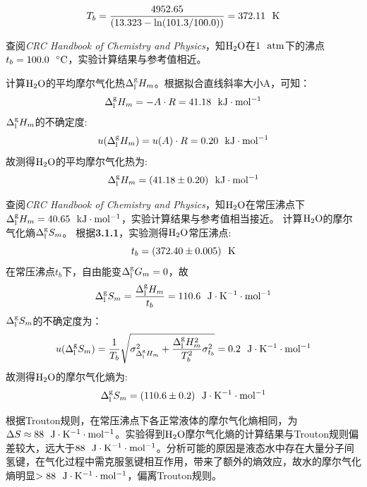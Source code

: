 \documentclass[12pt]{article}
\begin{document}
		$$
			T_{b}=\frac{4952.65}{(13.323-{\rm ln}(101.3/100.0))}=372.11\ \ {\rm K}
		$$
		\par
		查阅\textit{CRC Handbook of Chemistry and Physics}\citealp{crc}，知$\rm H_{2}O$在$\rm 1\ \ atm$下的沸点$t_{b}=100.0\ \ {\rm ^{\circ}C}$，实验计算结果与参考值相近。\par 
		计算$\rm H_{2}O$的平均摩尔气化热$\Delta^{\rm g}_{\rm l}H_{m}$。根据拟合直线斜率大小A，可知：
		$$
			\Delta^{\rm g}_{\rm l}H_{m}=-A\cdot R=41.18\ \ {\rm kJ\cdot mol^{-1}}
		$$
		$\Delta^{\rm g}_{\rm l}H_{m}$的不确定度:
		$$
			u(\Delta^{\rm g}_{\rm l}H_{m})=u(A)\cdot R=0.20\ \ {\rm kJ\cdot mol^{-1}}
		$$
		故测得$\rm H_{2}O$的平均摩尔气化热为:
		$$
			\Delta^{\rm g}_{\rm l}H_{m}=(41.18\pm 0.20)\ \ {\rm kJ\cdot mol^{-1}}
		$$
		\par
		查阅\textit{CRC Handbook of Chemistry and Physics}\citealp{crc}，知$\rm H_{2}O$在常压沸点下$\Delta^{\rm g}_{\rm l}H_{m}=40.65\ \ {\rm kJ\cdot mol^{-1}}$，实验计算结果与参考值相当接近。
		计算$\rm H_{2}O$的摩尔气化熵$\Delta^{\rm g}_{\rm l}S_{m}$。
		根据\textbf{3.1.1}，实验测得$\rm H_{2}O$常压沸点:
		$$
			t_{b}=(372.40\pm 0.005)\ \ {\rm K}
		$$
		在常压沸点$t_{b}$下，自由能变$\Delta^{\rm g}_{\rm l}G_{m}=0$，故
		$$
			\Delta^{\rm g}_{\rm l}S_{m}=\frac{\Delta^{\rm g}_{\rm l}H_{m}}{t_{b}}=110.6\ \ {\rm J\cdot K^{-1}\cdot mol^{-1}}
		$$
		$\Delta^{\rm g}_{\rm l}S_{m}$的不确定度为：
		$$
			u(\Delta^{\rm g}_{\rm l}S_{m})=\frac{1}{T_{b}} \sqrt{\sigma^{2}_{\Delta^{\rm g}_{\rm l}H_{m}}+\frac{\Delta^{\rm g}_{\rm l}H_{m}^{2}}{T_{b}^{2}}\sigma^{2}_{t_{b}}}=0.2\ \ {\rm J\cdot K^{-1}\cdot mol^{-1}}
		$$
		故测得$\rm H_{2}O$的摩尔气化熵为:
		$$
			\Delta^{\rm g}_{\rm l}S_{m}=(110.6\pm 0.2)\ \ {\rm J\cdot K^{-1}\cdot mol^{-1}}
		$$
		\par
		根据Trouton规则，在常压沸点下各正常液体的摩尔气化熵相同，为$\Delta S\approx 88\ \ {\rm J\cdot K^{-1}\cdot mol^{-1}}$。实验得到$\rm H_{2}O$摩尔气化熵的计算结果与Trouton规则偏差较大，远大于$88\ \ {\rm J\cdot K^{-1}\cdot mol^{-1}}$。分析可能的原因是液态水中存在大量分子间氢键，在气化过程中需克服氢键相互作用，带来了额外的熵效应，故水的摩尔气化熵明显$>88\ \ {\rm J\cdot K^{-1}\cdot mol^{-1}}$，偏离Trouton规则。
		\par
\end{document}

